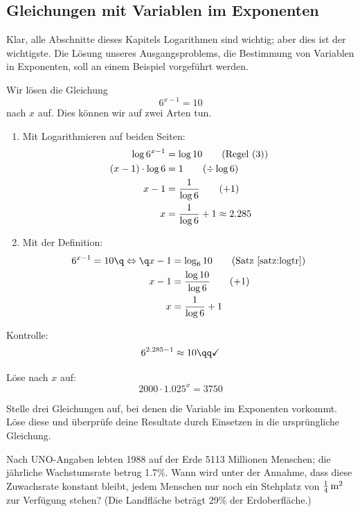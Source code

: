 \documentclass[%
11pt,%
twoside,%
titlepage,%
german,%
headsepline%
]{scrartcl}
\begin{document}
\subsection{Gleichungen mit Variablen im Exponenten}
Klar, alle Abschnitte dieses Kapitels Logarithmen sind wichtig; aber
dies ist der wichtigste. Die Lösung unseres Ausgangsproblems, die
Bestimmung von Variablen in Exponenten, soll an einem Beispiel
vorgeführt werden.
\begin{bsp}
  Wir lösen die Gleichung $$6^{x-1}=10$$ nach $x$ auf. Dies können
  wir auf zwei Arten tun.
  \begin{enumerate}
    \item Mit Logarithmieren auf beiden Seiten:
    \begin{align}
      \log{6^{x-1}}&=\log{10} \tag{Regel (3)}\\
      (x-1)\cdot\log{6}&= 1 \tag{$\div\log{6}$}\\
      x-1 &= \frac{1}{\log{6}} \tag{$+1$}\\
      x &= \frac{1}{\log{6}} + 1 \approx 2.285 \notag
    \end{align}
    \item Mit der Definition:
    \begin{align}
      6^{x-1}=10\q \Leftrightarrow\q x-1 &= \log_6{10} \tag{Satz \ref{satz:logtr}}\\
      x-1 &= \frac{\log{10}}{\log{6}} \tag{$+1$}\\
      x &= \frac{1}{\log{6}} + 1 \notag
    \end{align}
  \end{enumerate}
  Kontrolle: $$6^{2.285-1} \approx 10 \qq \checkmark$$
\end{bsp}

\begin{ueb}
  Löse nach $x$ auf: $$2000\cdot1.025^x = 3750$$
\end{ueb}

\begin{ueb}[Homework]
  Stelle drei Gleichungen auf, bei denen die Variable im
  Exponenten vorkommt. Löse diese und überprüfe deine Resultate durch
  Einsetzen in die ursprüngliche Gleichung.
\end{ueb}

\begin{ueb}[Weltbevölkerung]
Nach UNO-Angaben lebten 1988 auf der Erde 5113 Millionen Menschen; die jährliche Wachstumsrate betrug 1.7\%. Wann wird unter der Annahme, dass diese Zuwachsrate konstant bleibt, jedem Menschen nur noch ein Stehplatz von $\unit[\frac{1}{4}]{m^2}$ zur Verfügung stehen? (Die Landfläche beträgt 29\% der Erdoberfläche.)
\end{ueb}
\end{document}

